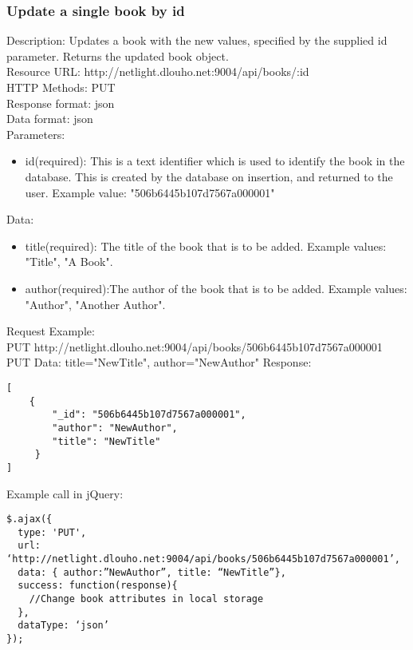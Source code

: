 \subsubsection{Update a single book by id}
Description: Updates a book with the new values, specified by the supplied id parameter. Returns the updated book object.	\\
\newline
Resource URL: http://netlight.dlouho.net:9004/api/books/:id	\\
HTTP Methods: PUT		\\
Response format: json	\\
Data format: json		\\
Parameters: 			\\
\begin{itemize}

\item id(required): This is a text identifier which is used to identify the book in the database. This is created by the database on insertion, and returned to the user. Example value: "506b6445b107d7567a000001"

\end{itemize}
Data:
\begin{itemize}

\item title(required): The title of the book that is to be added. Example values: "Title", "A Book".

\item author(required):The author of the book that is to be added. Example values: "Author", "Another Author".

\end{itemize}
Request Example:		\\
PUT 		http://netlight.dlouho.net:9004/api/books/506b6445b107d7567a000001	\\
PUT Data: title="NewTitle", author="NewAuthor"
\newline
Response:
\begin{verbatim}
[
    {
        "_id": "506b6445b107d7567a000001",
        "author": "NewAuthor",
        "title": "NewTitle"
     }
]
\end{verbatim}
Example call in jQuery:
\begin{verbatim}
$.ajax({
  type: 'PUT',
  url: ‘http://netlight.dlouho.net:9004/api/books/506b6445b107d7567a000001’,
  data: { author:”NewAuthor”, title: “NewTitle”},
  success: function(response){
  	//Change book attributes in local storage
  },
  dataType: ‘json’
});
\end{verbatim}

